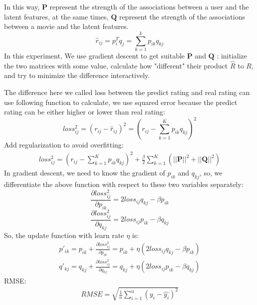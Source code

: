 \documentclass[journal, a4paper]{IEEEtran}
\begin{document}
In this way, $\boldsymbol{P}$ represent the strength of the associations between a user and the latent features, at the same times, $\boldsymbol{Q}$ represent the strength of the associations between a movie and the latent features.
\begin{displaymath}
\hat{r}_{ij} = p_i^Tq_j=\sum_{k=1}^kp_{ik}q_{kj}
\end{displaymath}
In this experiment, We use gradient descent to get suitable $\boldsymbol{P}$ and $\boldsymbol{Q}$ : initialize the two matrices with some value, calculate how "different" their product $\hat{R}$ to $R$, and try to minimize the difference interactively. 

The difference here we called loss between the predict rating and real rating can use following function to calculate, we use squared error because the predict rating can be either higher or lower than real rating:
\begin{displaymath}
loss_{ij}^2=(r_{ij}-\hat{r}_{ij})^2=(r_{ij}-\sum_{k=1}^Kp_{ik}q_{kj})^2
\end{displaymath}
Add regularization to avoid overfitting:
\begin{eqnarray}
loss_{ij}^2=(r_{ij}-\sum_{k=1}^Kp_{ik}q_{kj})^2+\frac{\beta}{2}\sum_{k=1}^K(||\boldsymbol{P}||^2+||\boldsymbol{Q}||^2)
\end{eqnarray}
In gradient descent, we need to know the gradient of $p_{ik}$ and $q_{kj}$, so, we differentiate the above function with respect to these two variables separately:
\begin{displaymath}
\frac{\partial loss_{ij}^2}{\partial p_{ik}}=2loss_{ij}q_{kj}-\beta p_{ik}
\end{displaymath}
\begin{displaymath}
\frac{\partial loss_{ij}^2}{\partial q_{kj}}=2loss_{ij}p_{ik}-\beta q_{kj}
\end{displaymath}
So, the update function with learn rate $\eta$ is:
\begin{eqnarray}
p'_{ik}=p_{ik}+\frac{\partial loss_{ij}^2}{\partial p_{ik}}=p_{ik}+\eta(2loss_{ij}q_{kj}-\beta p_{ik})
\end{eqnarray}
\begin{eqnarray}
q'_{kj}=q_{kj}+\frac{\partial loss_{ij}^2}{\partial q_{kj}}=q_{kj}+\eta(2loss_{ij}p_{ik}-\beta q_{kj})
\end{eqnarray}
RMSE:
\begin{eqnarray}
RMSE=\sqrt{\frac{1}{n}\sum_{i=1}^n(y_i-\hat{y_i})^2}
\end{eqnarray}
\end{document}
